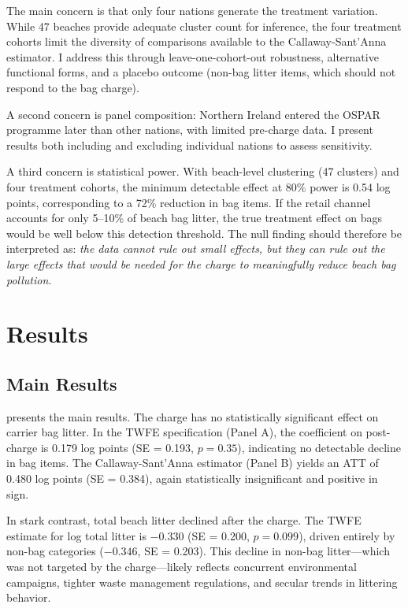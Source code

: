 \documentclass[12pt]{article}
\begin{document}
The main concern is that only four nations generate the treatment variation. While 47 beaches provide adequate cluster count for inference, the four treatment cohorts limit the diversity of comparisons available to the Callaway-Sant'Anna estimator. I address this through leave-one-cohort-out robustness, alternative functional forms, and a placebo outcome (non-bag litter items, which should not respond to the bag charge).

A second concern is panel composition: Northern Ireland entered the OSPAR programme later than other nations, with limited pre-charge data. I present results both including and excluding individual nations to assess sensitivity.

A third concern is statistical power. With beach-level clustering (47 clusters) and four treatment cohorts, the minimum detectable effect at 80\% power is 0.54 log points, corresponding to a 72\% reduction in bag items. If the retail channel accounts for only 5--10\% of beach bag litter, the true treatment effect on bags would be well below this detection threshold. The null finding should therefore be interpreted as: \textit{the data cannot rule out small effects, but they can rule out the large effects that would be needed for the charge to meaningfully reduce beach bag pollution.}

\section{Results}

\subsection{Main Results}

 presents the main results. The charge has no statistically significant effect on carrier bag litter. In the TWFE specification (Panel A), the coefficient on post-charge is 0.179 log points (SE = 0.193, $p = 0.35$), indicating no detectable decline in bag items. The Callaway-Sant'Anna estimator (Panel B) yields an ATT of 0.480 log points (SE = 0.384), again statistically insignificant and positive in sign.

In stark contrast, total beach litter declined after the charge. The TWFE estimate for log total litter is $-0.330$ (SE = 0.200, $p = 0.099$), driven entirely by non-bag categories ($-0.346$, SE = 0.203). This decline in non-bag litter---which was not targeted by the charge---likely reflects concurrent environmental campaigns, tighter waste management regulations, and secular trends in littering behavior.
\end{document}
